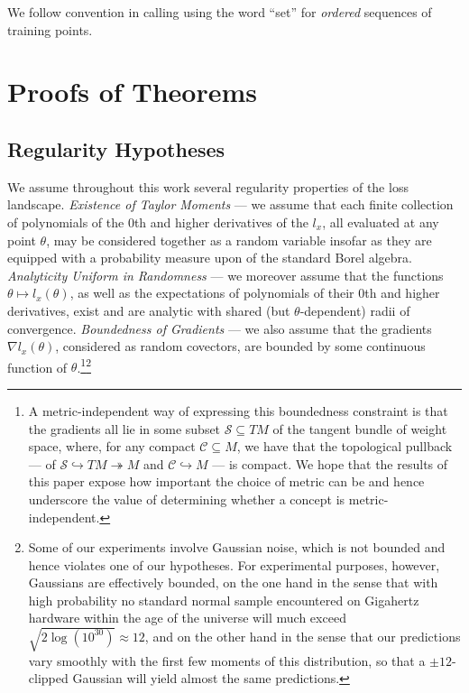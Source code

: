 \documentclass{article}
\theoremstyle{plain}
\theoremstyle{definition}
\newcommand{\Cc}{\mathcal{C}}   \newcommand{\CC}{\mathbb{C}}
\newcommand{\Ss}{\mathcal{S}}
\begin{document}
        We follow convention in calling using the word ``set'' for
        \emph{ordered} sequences of training points. 

\section{Proofs of Theorems} \label{sect:proofs}
   
    \subsection{Regularity Hypotheses}
        We assume throughout this work several regularity properties of the
        loss landscape.  \emph{Existence of Taylor Moments} --- we assume that
        each finite collection of polynomials of the $0$th and higher
        derivatives of the $l_x$, all evaluated at any point $\theta$, may be
        considered together as a random variable insofar
        as they are equipped with a probability measure upon of the standard
        Borel algebra.  \emph{Analyticity Uniform in Randomness} --- we
        moreover assume that the functions $\theta \mapsto l_x(\theta)$, as
        well as the expectations of polynomials of their $0$th and higher
        derivatives, exist and are analytic with shared (but
        $\theta$-dependent) radii of convergence.  \emph{Boundedness of
        Gradients} --- we also assume that the gradients $\nabla l_x(\theta)$,
        considered as random covectors, are bounded by some continuous function
        of $\theta$.\footnote{
            A metric-independent way of expressing this boundedness constraint
            is that the gradients all lie in some subset $\Ss \subseteq TM$ of
            the tangent bundle of weight space, where, for any compact $\Cc
            \subseteq M$, we have that the topological pullback --- of
            $\Ss \hookrightarrow TM \twoheadrightarrow M$
            and
            $\Cc \hookrightarrow M$ ---
            is compact.  We hope that the results of this paper expose how
            important the choice of metric can be and hence underscore the
            value of determining  whether a concept is metric-independent.
        }\footnote{
            Some of our experiments involve Gaussian noise, which is not
            bounded and hence violates one of our hypotheses.  For experimental
            purposes, however, Gaussians are effectively bounded, on the one
            hand in the sense that with high probability no standard normal
            sample encountered on Gigahertz hardware within the age of the
            universe will much exceed $\sqrt{2 \log(10^{30})} \approx 12$, and
            on the other hand in the sense that our predictions vary smoothly
            with the first few moments of this distribution, so that a $\pm
            12$-clipped Gaussian will yield almost the same predictions.
        }
\end{document}
